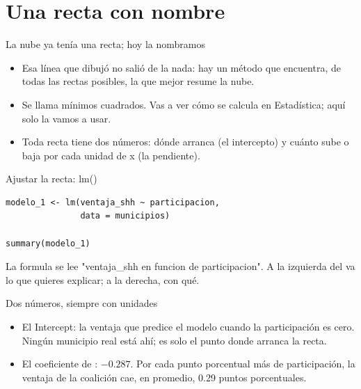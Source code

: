 \section{Una recta con nombre}

\begin{frame}{La nube ya tenía una recta; hoy la nombramos}
  \vspace{0.3em}
  \begin{itemize}\setlength{\itemsep}{0.9em}
    \item<1-> Esa línea que dibujó  no salió de la nada:
          hay un método que encuentra, de todas las rectas posibles, la que
          mejor resume la nube.
    \item<2-> Se llama \ac{mínimos cuadrados}. Vas a ver cómo se calcula en
          Estadística; aquí solo la vamos a usar.
    \item<3-> Toda recta tiene dos números: dónde arranca (el
          \ac{intercepto}) y cuánto sube o baja por cada unidad de x (la
          \ac{pendiente}).
  \end{itemize}
\end{frame}

\begin{frame}[fragile]{Ajustar la recta: lm()}
\begin{lstlisting}
modelo_1 <- lm(ventaja_shh ~ participacion,
               data = municipios)

summary(modelo_1)
\end{lstlisting}

  \vspace{0.6em}
  La formula se lee "ventaja\_shh en funcion de participacion". A la
  izquierda del \cod{\textasciitilde} va lo que quieres explicar; a la
  derecha, con qué.
\end{frame}

\begin{frame}{Dos números, siempre con unidades}
  \vspace{0.2em}
  \begin{itemize}\setlength{\itemsep}{0.85em}
    \item<1-> El \ac{Intercept}: la ventaja que predice el modelo cuando la
          participación es cero. Ningún municipio real está ahí; es solo el
          punto donde arranca la recta.
    \item<2-> El coeficiente de : $-0.287$. Por cada
          punto porcentual más de participación, la ventaja de la coalición
          cae, en promedio, 0.29 puntos porcentuales.
  \end{itemize}

  \vspace{1.0em}
\end{frame}

